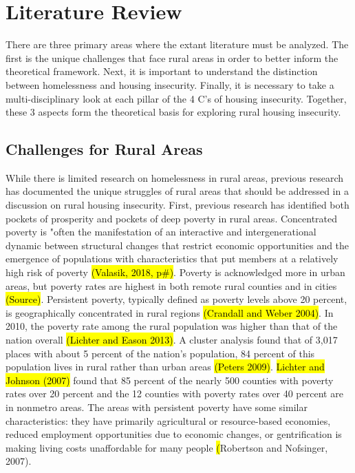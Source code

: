 \chapter{Literature Review}	%
There are three primary areas where the extant literature must be analyzed. The first is the unique challenges that face rural areas in order to better inform the theoretical framework. Next, it is important to understand the distinction between homelessness and housing insecurity. Finally, it is necessary to take a multi-disciplinary look at each pillar of the 4 C's of housing insecurity. Together, these 3 aspects form the theoretical basis for exploring rural housing insecurity.

\section{Challenges for Rural Areas}

 While there is limited research on homelessness in rural areas, previous research has documented the unique struggles of rural areas that should be addressed in a discussion on rural housing insecurity. First, previous research has identified both pockets of prosperity and pockets of deep poverty in rural areas. Concentrated poverty is "often the manifestation of an interactive and intergenerational dynamic between structural changes that restrict economic opportunities and the emergence of populations with characteristics that put members at a relatively high risk of poverty \hl{(Valasik, 2018, p\#)}. Poverty is acknowledged more in urban areas, but poverty rates are highest in both remote rural counties and in cities \hl{(Source)}. Persistent poverty, typically defined as poverty levels above 20 percent, is geographically concentrated in rural regions \hl{(Crandall and Weber 2004)}. In 2010, the poverty rate among the rural population was higher than that of the nation overall \hl{(Lichter and Eason 2013)}. A cluster analysis found that of 3,017 places with about 5 percent of the nation's population, 84 percent of this population lives in rural rather than urban areas \hl{(Peters 2009)}. \hl{Lichter and Johnson (2007)} found that 85 percent of the nearly 500 counties with poverty rates over 20 percent and the 12 counties with poverty rates over 40 percent are in nonmetro areas. The areas with persistent poverty have some similar characteristics: they have primarily agricultural or resource-based economies, reduced employment opportunities due to economic changes, or gentrification is making living costs unaffordable for many people \hl(Robertson and Nofsinger, 2007). 
 
